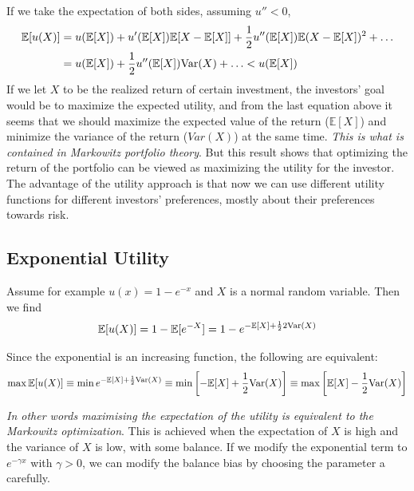 If we take the expectation of both sides, assuming $u'' < 0$,
\begin{equation*}
  \begin{aligned}
  \mathbb{E}[u(X)] &= u(\mathbb{E}[X]) + u'(\mathbb{E}[X]) \mathbb{E}[X-\mathbb{E}[X]] + \frac{1}{2}u''(\mathbb{E}[X]) \mathbb{E}(X-\mathbb{E}[X])^2 + \ldots\\
  &= u (\mathbb{E}[X]) + \frac{1}{2}u'' (\mathbb{E}[X]) \text{Var}(X) + \ldots < u (\mathbb{E}[X])
  \end{aligned}
\end{equation*}
If we let $X$ to be the realized return of certain investment, the investors’ goal would be to maximize the expected utility, and from the last equation above it seems
that we should maximize the expected value of the return ($\mathbb{E}[X]$) and minimize the variance of the return ($Var(X)$) at the same time. \emph{This is what is contained in Markowitz portfolio theory}.
But this result shows that optimizing the return of the portfolio can be viewed as maximizing the utility for the investor. The
advantage of the utility approach is that now we can use different utility functions for different investors’ preferences, mostly about their preferences towards risk.

\subsection{Exponential Utility}
Assume for example $u(x) = 1-e^{-x}$ and $X$ is a normal random variable. Then we find
\begin{equation*}
  \mathbb{E}[u(X)] = 1-\mathbb{E}[e^{-X}] = 1-e^{-\mathbb{E}[X]+ \frac{1}{2}2\text{Var}(X)}
\end{equation*}

Since the exponential is an increasing function, the following are equivalent:
\begin{equation*}
\max \mathbb{E}[u(X)] \equiv \min e^{-\mathbb{E}[X]+ \frac{1}{2}\text{Var}(X)} \equiv \min\left[-\mathbb{E}[X] + \frac{1}{2}\text{Var}(X)\right] \equiv \max\left[\mathbb{E}[X] - \frac{1}{2}\text{Var}(X)\right]
\end{equation*}

\emph{In other words maximising the expectation of the utility is equivalent to the Markowitz optimization}.
This is achieved when the expectation of $X$ is high and the variance of $X$ is low, with some balance. If we modify the exponential term to $e^{-\gamma x}$ with $\gamma > 0$, we can modify the balance bias by choosing the parameter a carefully.

